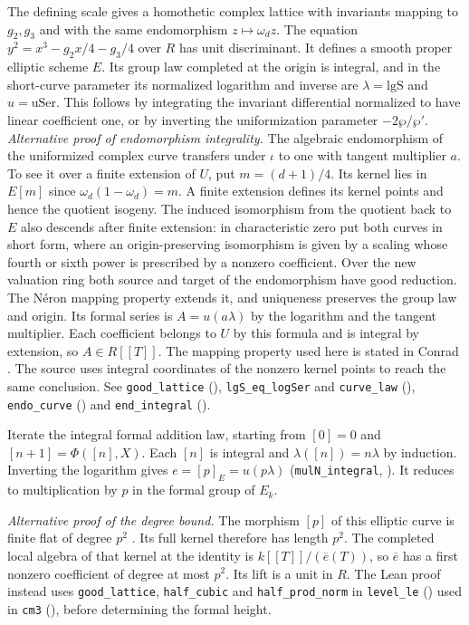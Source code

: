 The defining scale gives a homothetic complex lattice with invariants
mapping to $g_2,g_3$ and with the same endomorphism $z\mapsto\omega_d z$.
The equation $y^2=x^3-g_2x/4-g_3/4$ over $R$ has unit discriminant.
It defines a smooth proper elliptic scheme $E$. Its group law completed
at the origin is integral, and in the short-curve parameter its
normalized logarithm and inverse are $\lambda=\mathrm{lgS}$ and
$u=\mathrm{uSer}$. This follows by integrating the invariant
differential normalized to have linear coefficient one, or by inverting
the uniformization parameter $-2\wp/\wp'$. \emph{Alternative proof of endomorphism integrality.} The algebraic endomorphism
of the uniformized complex curve transfers under $\iota$ to one with
tangent multiplier $a$. To see it over a finite extension of $U$,
put $m=(d+1)/4$. Its kernel lies in $E[m]$ since
$\omega_d(1-\omega_d)=m$. A finite extension defines its kernel
points and hence the quotient isogeny. The induced isomorphism
from the quotient back to $E$ also descends after finite extension:
in characteristic zero put both curves in short form, where an
origin-preserving isomorphism is given by a scaling whose fourth or
sixth power is prescribed by a nonzero coefficient. Over the new
valuation ring both source and target of the endomorphism have good
reduction. The N\'eron mapping property extends it, and uniqueness
preserves the group law and origin. Its formal series is
$A=u(a\lambda)$ by the logarithm and the tangent multiplier. Each
coefficient belongs to $U$ by this formula and is integral by extension,
so $A\in R[[T]]$. The mapping property used here is stated in
Conrad \cite[Definition~5.1 and Example~5.3]{P-R9-Conrad}. The source uses integral coordinates of the nonzero
kernel points to reach the same conclusion. See \nolinkurl{good_lattice}
(), \nolinkurl{lgS_eq_logSer} and
\nolinkurl{curve_law} (),
\nolinkurl{endo_curve} () and
\nolinkurl{end_integral} ().

Iterate the integral formal addition law, starting from $[0]=0$ and
$[n+1]=\Phi([n],X)$. Each $[n]$ is integral and
$\lambda([n])=n\lambda$ by induction. Inverting the logarithm gives
$e=[p]_E=u(p\lambda)$ (\nolinkurl{mulN_integral}, ).
It reduces to multiplication
by $p$ in the formal group of $E_k$.

\emph{Alternative proof of the degree bound.} The morphism $[p]$ of this
elliptic curve is finite flat of degree $p^2$ \cite[Lemma~39.9.8, Tag~0BFG]{P-R9-Stacks}. Its full kernel therefore has length $p^2$.
The completed local algebra of that kernel at the identity is
$k[[T]]/(\overline e(T))$, so $\overline e$ has a first nonzero
coefficient of degree at most $p^2$. Its lift is a unit in $R$.
The Lean proof instead uses \nolinkurl{good_lattice}, \nolinkurl{half_cubic}
and \nolinkurl{half_prod_norm} in \nolinkurl{level_le} ()
used in \nolinkurl{cm3} (),
before determining the formal height.

